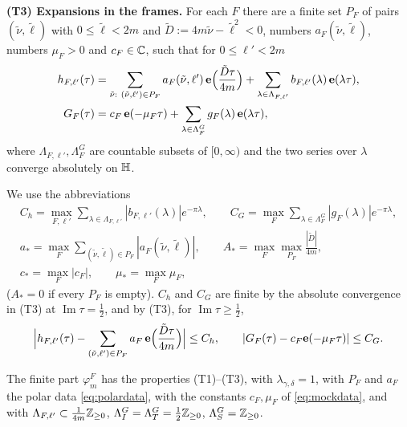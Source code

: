 \medskip\noindent\textbf{(T3) Expansions in the frames.} For each $F$ there are a finite set $P_F$ of pairs $(\tilde\nu,\tilde\ell)$ with $0\le\tilde\ell<2m$ and $\tilde D:=4m\tilde\nu-\tilde\ell^2<0$, numbers $a_F(\tilde\nu,\tilde\ell)$, numbers $\mu_F>0$ and $c_F\in\mathbb{C}$, such that for $0\le\ell'<2m$
\begin{align}
h_{F,\ell'}(\tau)&=\sum_{\tilde\nu:\ (\tilde\nu,\ell')\in P_F}a_F(\tilde\nu,\ell')\,\mathbf e\Big(\frac{\tilde D\tau}{4m}\Big)+\sum_{\lambda\in\Lambda_{F,\ell'}}b_{F,\ell'}(\lambda)\,\mathbf e(\lambda\tau),\label{circ:T3h}\\
G_F(\tau)&=c_F\,\mathbf e(-\mu_F\tau)+\sum_{\lambda\in\Lambda^G_F}g_F(\lambda)\,\mathbf e(\lambda\tau),\label{circ:T3G}
\end{align}
where $\Lambda_{F,\ell'},\Lambda_F^G$ are countable subsets of $[0,\infty)$ and the two series over $\lambda$ converge absolutely on $\mathbb{H}$.

\medskip
We use the abbreviations
\begin{equation}\label{circ:consts}
\begin{gathered}
C_h=\max_{F,\ell'}\sum_{\lambda\in\Lambda_{F,\ell'}}|b_{F,\ell'}(\lambda)|e^{-\pi\lambda},\qquad C_G=\max_F\sum_{\lambda\in\Lambda^G_F}|g_F(\lambda)|e^{-\pi\lambda},\\
a_*=\max_F\sum_{(\tilde\nu,\tilde\ell)\in P_F}|a_F(\tilde\nu,\tilde\ell)|,\qquad A_*=\max_F\max_{P_F}\frac{|\tilde D|}{4m},\\
c_*=\max_F|c_F|,\qquad\mu_*=\max_F\mu_F,
\end{gathered}
\end{equation}
($A_*=0$ if every $P_F$ is empty). $C_h$ and $C_G$ are finite by the absolute convergence in (T3) at $\operatorname{Im}\tau=\frac12$, and by (T3), for $\operatorname{Im}\tau\ge\frac12$,
\begin{equation}\label{circ:rembound}
\Big|h_{F,\ell'}(\tau)-\sum_{(\tilde\nu,\ell')\in P_F}a_F\,\mathbf e\Big(\frac{\tilde D\tau}{4m}\Big)\Big|\le C_h,\qquad |G_F(\tau)-c_F\mathbf e(-\mu_F\tau)|\le C_G .
\end{equation}

\begin{proposition}\label{circ:prop:input}
The finite part $\varphi^F_m$ has the properties \textup{(T1)--(T3)}, with $\lambda_{\gamma,\delta}=1$, with $P_F$ and $a_F$ the polar data \eqref{eq:polardata}, with the constants $c_F,\mu_F$ of \eqref{eq:mockdata}, and with $\Lambda_{F,\ell'}\subset\frac1{4m}\mathbb{Z}_{\ge0}$, $\Lambda^G_I=\Lambda^G_T=\frac12\mathbb{Z}_{\ge0}$, $\Lambda^G_S=\mathbb{Z}_{\ge0}$.
\end{proposition}

